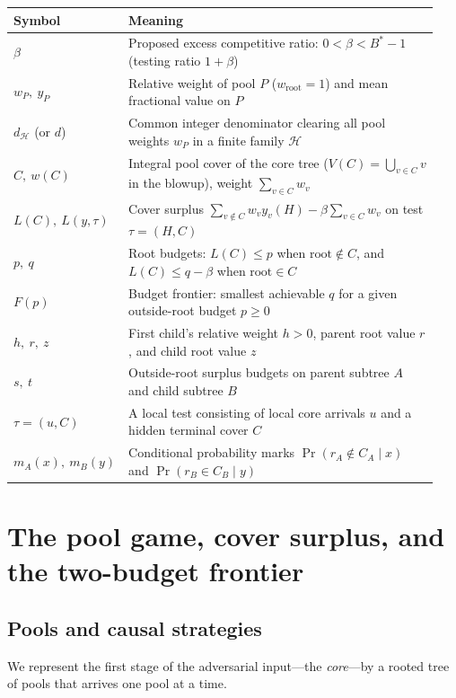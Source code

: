 \documentclass[11pt,letterpaper]{article}
\begin{document}
\begin{center}
\small\renewcommand{\arraystretch}{1.23}
\begin{tabular}{@{}p{0.17\linewidth}p{0.77\linewidth}@{}}
\hline
\textbf{Symbol} & \textbf{Meaning} \\
\hline
$\beta$ & Proposed excess competitive ratio: $0<\beta<B^*-1$ (testing ratio $1+\beta$) \\
$w_P,\ y_P$ & Relative weight of pool $P$ ($w_{\text{root}}=1$) and mean fractional value on $P$ \\
$d_{\mathcal H}$ (or $d$) & Common integer denominator clearing all pool weights $w_P$ in a finite family $\mathcal H$ \\
$C,\ w(C)$ & Integral pool cover of the core tree ($V(C)=\bigcup_{v\in C}v$ in the blowup), weight $\sum_{v\in C} w_v$ \\
$L(C),\ L(y,\tau)$ & Cover surplus $\sum_{v\notin C} w_v y_v(H) - \beta \sum_{v\in C} w_v$ on test $\tau=(H,C)$ \\
$p,\ q$ & Root budgets: $L(C)\le p$ when $\text{root}\notin C$, and $L(C)\le q-\beta$ when $\text{root}\in C$ \\
$F(p)$ & Budget frontier: smallest achievable $q$ for a given outside-root budget $p\ge 0$ \\
$h,\ r,\ z$ & First child's relative weight $h>0$, parent root value $r$, and child root value $z$ \\
$s,\ t$ & Outside-root surplus budgets on parent subtree $A$ and child subtree $B$ \\
$\tau=(u,C)$ & A local test consisting of local core arrivals $u$ and a hidden terminal cover $C$ \\
$m_A(x),\ m_B(y)$ & Conditional probability marks $\Pr(r_A\notin C_A\mid x)$ and $\Pr(r_B\in C_B\mid y)$ \\
\hline
\end{tabular}
\end{center}

\section{The pool game, cover surplus, and the two-budget frontier}\label{sec:game}

\subsection{Pools and causal strategies}

We represent the first stage of the adversarial input---the \emph{core}---by a rooted tree of pools that arrives one pool at a time.
\end{document}
